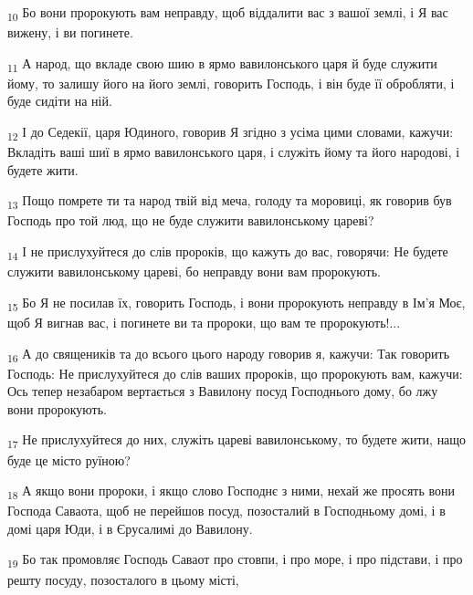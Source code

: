 \begin{tcolorbox}
\textsubscript{10} Бо вони пророкують вам неправду, щоб віддалити вас з вашої землі, і Я вас вижену, і ви погинете.
\end{tcolorbox}
\begin{tcolorbox}
\textsubscript{11} А народ, що вкладе свою шию в ярмо вавилонського царя й буде служити йому, то залишу його на його землі, говорить Господь, і він буде її обробляти, і буде сидіти на ній.
\end{tcolorbox}
\begin{tcolorbox}
\textsubscript{12} І до Седекії, царя Юдиного, говорив Я згідно з усіма цими словами, кажучи: Вкладіть ваші шиї в ярмо вавилонського царя, і служіть йому та його народові, і будете жити.
\end{tcolorbox}
\begin{tcolorbox}
\textsubscript{13} Пощо помрете ти та народ твій від меча, голоду та моровиці, як говорив був Господь про той люд, що не буде служити вавилонському цареві?
\end{tcolorbox}
\begin{tcolorbox}
\textsubscript{14} І не прислухуйтеся до слів пророків, що кажуть до вас, говорячи: Не будете служити вавилонському цареві, бо неправду вони вам пророкують.
\end{tcolorbox}
\begin{tcolorbox}
\textsubscript{15} Бо Я не посилав їх, говорить Господь, і вони пророкують неправду в Ім'я Моє, щоб Я вигнав вас, і погинете ви та пророки, що вам те пророкують!...
\end{tcolorbox}
\begin{tcolorbox}
\textsubscript{16} А до священиків та до всього цього народу говорив я, кажучи: Так говорить Господь: Не прислухуйтеся до слів ваших пророків, що пророкують вам, кажучи: Ось тепер незабаром вертається з Вавилону посуд Господнього дому, бо лжу вони пророкують.
\end{tcolorbox}
\begin{tcolorbox}
\textsubscript{17} Не прислухуйтеся до них, служіть цареві вавилонському, то будете жити, нащо буде це місто руїною?
\end{tcolorbox}
\begin{tcolorbox}
\textsubscript{18} А якщо вони пророки, і якщо слово Господнє з ними, нехай же просять вони Господа Саваота, щоб не перейшов посуд, позосталий в Господньому домі, і в домі царя Юди, і в Єрусалимі до Вавилону.
\end{tcolorbox}
\begin{tcolorbox}
\textsubscript{19} Бо так промовляє Господь Саваот про стовпи, і про море, і про підстави, і про решту посуду, позосталого в цьому місті,
\end{tcolorbox}

